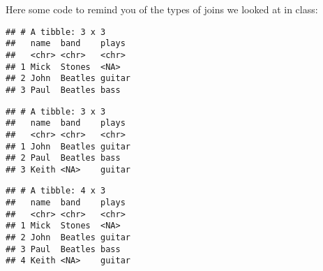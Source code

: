 \documentclass[
]{article}
\newenvironment{Shaded}{\begin{snugshade}}{\end{snugshade}}
\newcommand{\DataTypeTok}[1]{\textcolor[rgb]{0.13,0.29,0.53}{#1}}
\newcommand{\KeywordTok}[1]{\textcolor[rgb]{0.13,0.29,0.53}{\textbf{#1}}}
\newcommand{\NormalTok}[1]{#1}
\newcommand{\OperatorTok}[1]{\textcolor[rgb]{0.81,0.36,0.00}{\textbf{#1}}}
\newcommand{\StringTok}[1]{\textcolor[rgb]{0.31,0.60,0.02}{#1}}
\begin{document}
Here some code to remind you of the types of joins we looked at in
class:

\begin{Shaded}
\end{Shaded}

\begin{verbatim}
## # A tibble: 3 x 3
##   name  band    plays 
##   <chr> <chr>   <chr> 
## 1 Mick  Stones  <NA>  
## 2 John  Beatles guitar
## 3 Paul  Beatles bass
\end{verbatim}

\begin{Shaded}
\end{Shaded}

\begin{verbatim}
## # A tibble: 3 x 3
##   name  band    plays 
##   <chr> <chr>   <chr> 
## 1 John  Beatles guitar
## 2 Paul  Beatles bass  
## 3 Keith <NA>    guitar
\end{verbatim}

\begin{Shaded}
\end{Shaded}

\begin{verbatim}
## # A tibble: 4 x 3
##   name  band    plays 
##   <chr> <chr>   <chr> 
## 1 Mick  Stones  <NA>  
## 2 John  Beatles guitar
## 3 Paul  Beatles bass  
## 4 Keith <NA>    guitar
\end{verbatim}

\begin{Shaded}
\end{Shaded}
\end{document}
